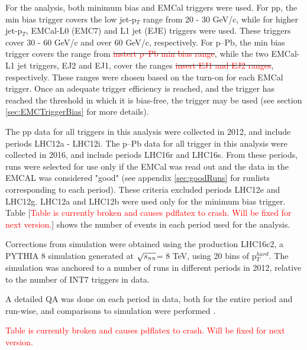 \documentclass[ALICE]{ALICE_analysis_notes}
\newcommand{\sNN}{$\sqrt{s_{\mbox{\tiny NN}}}$\xspace}
\newcommand{\pPb}{{\mbox{p--Pb}}\xspace}
\newcommand{\pp}{pp\xspace}
\providecommand{\DIFaddtex}[1]{{\protect\color{blue}\uwave{#1}}} %
\providecommand{\DIFdeltex}[1]{{\protect\color{red}\sout{#1}}}                      %
\providecommand{\DIFaddbegin}{} %
\providecommand{\DIFaddend}{} %
\providecommand{\DIFdelbegin}{} %
\providecommand{\DIFdelend}{} %
\providecommand{\DIFadd}[1]{\texorpdfstring{\DIFaddtex{#1}}{#1}} %
\providecommand{\DIFdel}[1]{\texorpdfstring{\DIFdeltex{#1}}{}} %
\newcommand{\DIFscaledelfig}{0.5}
\newlength{\DIFdelgraphicswidth} %
\newlength{\DIFdelgraphicsheight} %
\newcommand{\DIFaddincludegraphics}[2][]{{\color{blue}\fbox{\DIFOincludegraphics[#1]{#2}}}} %
\newcommand{\DIFdelincludegraphics}[2][]{%
\sbox{\DIFdelgraphicsbox}{\DIFOincludegraphics[#1]{#2}}%
\settoboxwidth{\DIFdelgraphicswidth}{\DIFdelgraphicsbox} %
\settoboxtotalheight{\DIFdelgraphicsheight}{\DIFdelgraphicsbox} %
\scalebox{\DIFscaledelfig}{%
\parbox[b]{\DIFdelgraphicswidth}{\usebox{\DIFdelgraphicsbox}\\[-\baselineskip] \rule{\DIFdelgraphicswidth}{0em}}\llap{\resizebox{\DIFdelgraphicswidth}{\DIFdelgraphicsheight}{%
\setlength{\unitlength}{\DIFdelgraphicswidth}%
\begin{picture}(1,1)%
\thicklines\linethickness{2pt} %
{\color[rgb]{1,0,0}\put(0,0){\framebox(1,1){}}}%
{\color[rgb]{1,0,0}\put(0,0){\line( 1,1){1}}}%
{\color[rgb]{1,0,0}\put(0,1){\line(1,-1){1}}}%
\end{picture}%
}\hspace*{3pt}}} %
} %
\DeclareRobustCommand{\DIFaddbegin}{\DIFOaddbegin \let\includegraphics\DIFaddincludegraphics} %
\DeclareRobustCommand{\DIFaddend}{\DIFOaddend \let\includegraphics\DIFOincludegraphics} %
\DeclareRobustCommand{\DIFdelbegin}{\DIFOdelbegin \let\includegraphics\DIFdelincludegraphics} %
\DeclareRobustCommand{\DIFdelend}{\DIFOaddend \let\includegraphics\DIFOincludegraphics} %
\begin{document}
For the analysis, both minimum bias and EMCal triggers were used. For \pp, the min bias trigger covers the low jet-p$_T$ range from 20 - 30 GeV/c, while for higher jet-p$_T$, EMCal-L0 (EMC7) and L1 jet (EJE) triggers were used. These triggers cover 30 - 60 GeV/c and over 60 GeV/c, respectively. For \pPb, the min bias trigger covers the range from \DIFdelbegin \DIFdel{\textcolor{red}{instert \pPb min bias range}}\DIFdelend \DIFaddbegin \DIFadd{20-30 GeV/c}\DIFaddend , while the two EMCal-L1 jet triggers, EJ2 and EJ1, cover the ranges \DIFdelbegin \DIFdel{\textcolor{red}{insert EJ1 and EJ2 ranges}}\DIFdelend \DIFaddbegin \DIFadd{30 - 50 GeV/c and 50 - 240 GeV}\DIFaddend , respectively.  These ranges were chosen based on the turn-on for each EMCal trigger. Once an adequate trigger efficiency is reached, and the trigger has reached the threshold in which it is bias-free, the trigger may be used (see section \ref{sec:EMCTriggerBias} for more details).

The \pp data for all triggers in this analysis were collected in 2012, and include periods LHC12a - LHC12i. The \pPb data for all trigger in this analysis were collected in 2016, and include periods LHC16r and LHC16s. From these periods, runs were selected for use only if the EMCal was read out and the data in the EMCAL was considered "good" (see appendix \ref{sec:goodRuns} for runlists corresponding to each period). These criteria excluded periods LHC12e and LHC12g. LHC12a and LHC12b were used only for the minimum bias trigger. Table [\textcolor{red}{Table is currently broken and causes pdflatex to crash. Will be fixed for next version.}] shows the number of events in each period used for the analysis.

Corrections from simulation were obtained using the production LHC16c2, a PYTHIA 8 simulation generated at \sNN = 8 TeV, using 20 bins of p$_T^{hard}$. The simulation was anchored to a number of runs in different periods in 2012, relative to the number of INT7 triggers in data.

A detailed QA was done on each period in data, both for the entire period and run-wise, and comparisons to simulation were performed \cite{JIRATicket}.

\textcolor{red}{Table is currently broken and causes pdflatex to crash. Will be fixed for next version.}

\iffalse
\end{document}
